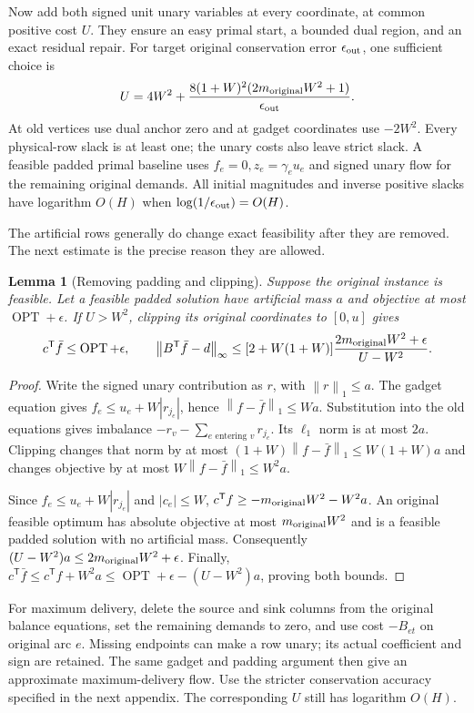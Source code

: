 \documentclass[11pt]{article}
\newtheorem{lemma}[theorem]{Lemma}
\theoremstyle{definition}\newtheorem{definition}[theorem]{Definition}
\theoremstyle{remark}\newtheorem{remark}[theorem]{Remark}
\newcommand{\norm}[1]{\left\lVert#1\right\rVert}
\DeclareMathOperator{\OPT}{OPT}
\begin{document}
Now add both signed unit unary variables at every coordinate, at common
positive cost $U$. They ensure an easy primal start, a bounded dual
region, and an exact residual repair. For target original conservation
error $\epsilon_{\rm out}$, one sufficient choice is
\[
 U=4W^2+
       \frac{8(1+W)^2(2m_{\rm original}W^2+1)}{\epsilon_{\rm out}}.
\]
At old vertices use dual anchor zero and at gadget coordinates use
$-2W^2$. Every physical-row slack is at least one; the unary costs
also leave strict slack. A feasible padded primal baseline uses
$f_e=0,z_e=\gamma_eu_e$ and signed unary flow for the remaining original
demands. All initial magnitudes and inverse positive slacks have
logarithm $O(H)$ when $\log(1/\epsilon_{\rm out})=O(H)$.

The artificial rows generally do change exact feasibility after they
are removed. The next estimate is the precise reason they are allowed.

\begin{lemma}[Removing padding and clipping]\label{lem:padding}
Suppose the original instance is feasible. Let a feasible padded solution
have artificial mass $a$ and objective at most $\OPT+\epsilon$.
If $U>W^2$, clipping its original coordinates to $[0,u]$ gives
\[
 c^{\mathsf T}\bar f\le\OPT+\epsilon,\qquad
 \norm{B^{\mathsf T}\bar f-d}_\infty
 \le [2+W(1+W)]\frac{2m_{\rm original}W^2+\epsilon}{U-W^2}.
\]
\end{lemma}
\begin{proof}
Write the signed unary contribution as $r$, with $\norm r_1\le a$.
The gadget equation gives $f_e\le u_e+W|r_{j_e}|$, hence
$\norm{f-\bar f}_1\le Wa$. Substitution into the old equations gives
imbalance $-r_v-\sum_{e\text{ entering }v}r_{j_e}$. Its $\ell_1$ norm
is at most $2a$. Clipping changes that norm by at most
$(1+W)\norm{f-\bar f}_1\le W(1+W)a$ and changes objective by at most
$W\norm{f-\bar f}_1\le W^2a$.

Since $f_e\le u_e+W|r_{j_e}|$ and $|c_e|\le W$,
$c^{\mathsf T}f\ge-m_{\rm original}W^2-W^2a$.
An original feasible optimum has absolute objective at most
$m_{\rm original}W^2$ and is a feasible padded solution with no
artificial mass. Consequently
$(U-W^2)a\le2m_{\rm original}W^2+\epsilon$.
Finally,
$c^{\mathsf T}\bar f\le c^{\mathsf T}f+W^2a
\le\OPT+\epsilon-(U-W^2)a$, proving both bounds.
\end{proof}

For maximum delivery, delete the source and sink columns from the
original balance equations, set the remaining demands to zero, and use
cost $-B_{et}$ on original arc $e$. Missing endpoints can make a row
unary; its actual coefficient and sign are retained. The same gadget
and padding argument then give an approximate maximum-delivery flow.
Use the stricter conservation accuracy specified in the next appendix.
The corresponding $U$ still has logarithm $O(H)$.
\end{document}

